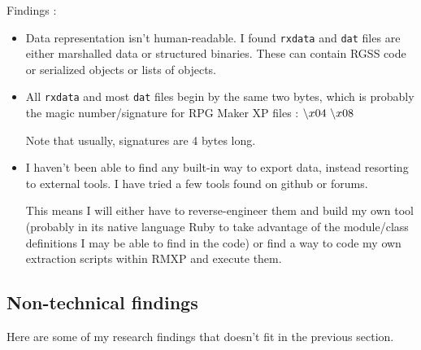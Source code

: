 \documentclass[11pt]{article}
\newcommand\BS{\char`\\}
\begin{document}
Findings :
\begin{itemize}
	\item Data representation isn't human-readable. I found \verb|rxdata| and \verb|dat| files are either marshalled data or structured binaries. These can contain RGSS code or serialized objects or lists of objects.
	
	\item All \verb|rxdata| and most \verb|dat| files begin by the same two bytes, which is probably the magic number/signature for RPG Maker XP files : $\BS x04 \ \BS x08$
	
	Note that usually, signatures are 4 bytes long.
	
	\item I haven't been able to find any built-in way to export data, instead resorting to external tools. I have tried a few tools found on github or forums. %
	
	This means I will either have to reverse-engineer them and build my own tool (probably in its native language Ruby to take advantage of the module/class definitions I may be able to find in the code) or find a way to code my own extraction scripts within RMXP and execute them.
\end{itemize}



\subsection{Non-technical findings}

Here are some of my research findings that doesn't fit in the previous section. 
\end{document}
